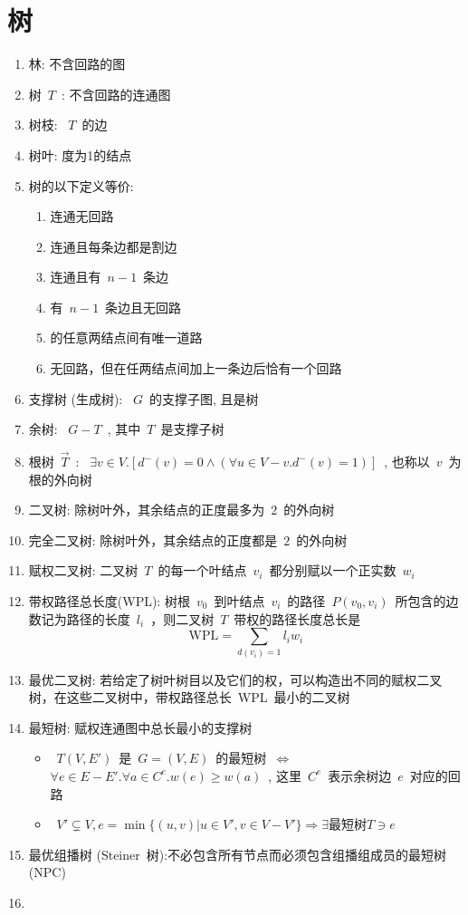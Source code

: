 \documentclass[11pt,a4paper]{article}%
\renewcommand{\[}{~$}
\renewcommand{\]}{$~}%
\begin{document}
\section{树}
	\begin{enumerate}
	 \item 林: 不含回路的图
	 \item 树\[T\]: 不含回路的连通图
	 \item 树枝: \[T\]的边
	 \item 树叶: 度为1的结点
	 \item 树的以下定义等价:
	 	\begin{enumerate}
	 	 \item 连通无回路
	 	 \item 连通且每条边都是割边
	 	 \item 连通且有\[n-1\]条边
	 	 \item 有\[n-1\]条边且无回路
	 	 \item 的任意两结点间有唯一道路
	 	 \item 无回路，但在任两结点间加上一条边后恰有一个回路
	 	\end{enumerate}
	 \item 支撑树 (生成树): \[G\]的支撑子图, 且是树
	 \item 余树: \[G-T\], 其中\[T\]是支撑子树
	 \item 根树\[\vec T\]: \[\exists v\in V. [d^-(v)=0 \land (\forall u\in V-v. d^-(v)=1)]\], 也称以\[v\]为根的外向树
	 \item 二叉树: 除树叶外，其余结点的正度最多为\[2\]的外向树
	 \item 完全二叉树: 除树叶外，其余结点的正度都是\[2\]的外向树
	 \item 赋权二叉树: 二叉树\[T\]的每一个叶结点\[v_i\]都分别赋以一个正实数\[w_i\]
	 \item 带权路径总长度(WPL): 树根\[v_0\]到叶结点\[v_i\]的路径\[P(v_0,v_i)\]所包含的边数记为路径的长度\[l_i\]，则二叉树\[T\]带权的路径长度总长是
	 	$$ \mbox{WPL} = \sum_{d(v_i)=1} l_i w_i $$
	 \item 最优二叉树: 若给定了树叶树目以及它们的权，可以构造出不同的赋权二叉树，在这些二叉树中，带权路径总长~WPL~最小的二叉树
	 \item 最短树: 赋权连通图中总长最小的支撑树
	 	\begin{itemize}
	 	 \item \[T(V,E')\]是\[G=(V,E)\]的最短树\[\Leftrightarrow\]\[\forall e \in E-E'.\forall a\in C^e.w(e)\ge w(a)\], 这里\[C^e\]表示余树边\[e\]对应的回路
	 	 \item \[V'\subsetneq V, e=\min \{(u,v)|u\in V', v\in V-V'\} \Rightarrow \exists \mbox{最短树}T\ni e \]
	 	\end{itemize}
	 \item 最优组播树 (Steiner~树):不必包含所有节点而必须包含组播组成员的最短树 (NPC)
	 \item 
	\end{enumerate}
	
\end{document}
